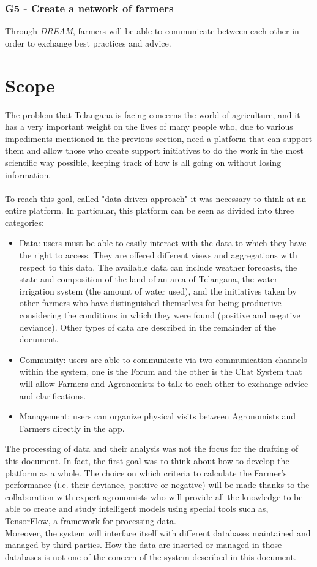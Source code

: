 \documentclass[10pt]{report}
\begin{document}
    \subsubsection{G5 - Create a network of farmers}
    Through \emph{DREAM}, farmers will be able to communicate between each other in order to exchange best practices and advice.
    \section{Scope}
    The problem that Telangana is facing concerns the world of agriculture, and it has a very important weight on the lives of many people who, due to various impediments mentioned in the previous section, need a platform that can support them and allow those who create support initiatives to do the work in the most scientific way possible, keeping track of how is all going on without losing information. \\ \\
    To reach this goal, called "data-driven approach" it was necessary to think at an entire platform. In particular, this platform can be seen as divided into three categories:
    \begin{itemize}
        \item Data: users must be able to easily interact with the data to which they have the right to access. They are offered different views and aggregations with respect to this data. The available data can include weather forecasts, the state and composition of the land of an area of Telangana, the water irrigation system (the amount of water used), and the initiatives taken by other farmers who have distinguished themselves for being productive considering the conditions in which they were found (positive and negative deviance). Other types of data are described in the remainder of the document.
        \item Community: users are able to communicate via two communication channels within the system, one is the Forum and the other is the Chat System that will allow Farmers and Agronomists to talk to each other to exchange advice and clarifications.
        \item Management: users can organize physical visits between Agronomists and Farmers directly in the app.
    \end{itemize}
    The processing of data and their analysis was not the focus for the drafting of this document. In fact, the first goal was to think about how to develop the platform as a whole. The choice on which criteria to calculate the Farmer's performance (i.e. their deviance, positive or negative) will be made thanks to the collaboration with expert agronomists who will provide all the knowledge to be able to create and study intelligent models using special tools such as, TensorFlow, a framework for processing data. \\
    Moreover, the system will interface itself with different databases maintained and managed by third parties. How the data are inserted or managed in those databases is not one of the concern of the system described in this document.
\end{document}

